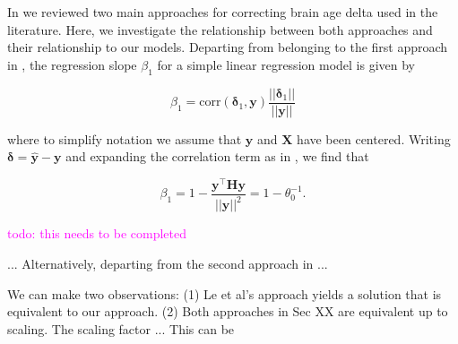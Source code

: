 \documentclass[utf8]{frontiersSCNS} %
\newcommand{\todo}[1]{\textcolor{Magenta}{todo: #1}}
\renewcommand{\a}{\theta}
\newcommand{\az}{\a_0}
\newcommand{\corr}{\text{corr}}
\renewcommand{\d}{\boldsymbol{\delta}}
\renewcommand{\H}{\mathbf{H}}
\newcommand{\X}{\mathbf{X}}
\newcommand{\y}{\mathbf{y}}
\newcommand{\yh}{\mathbf{\hat{y}}}
\begin{document}

In  we reviewed two main approaches for correcting brain age delta used in the literature. Here, we investigate the relationship between both approaches and their relationship to our models.
Departing from  belonging to the first approach in  , the regression slope $\beta_1$ for a simple linear regression model is given by

\[
\beta_1 = \corr(\d_1, \y)\frac{||\d_1||}{||\y||}
\]

where to simplify notation we assume that $\y$ and $\X$ have been centered. Writing $\d = \yh - \y$ and expanding the correlation term as in , we find that

\[
\beta_1 = 1 - \frac{\y^\top\H\y}{||\y||^2} = 1 - \az^{-1} .
\]

\todo{this needs to be completed} 

...
Alternatively, departing from the second approach in ... 



We can make two observations: (1) Le et al's approach yields a solution that is equivalent to our approach. (2) Both approaches in Sec XX are equivalent up to scaling. The scaling factor ... This can be 


\end{document}
